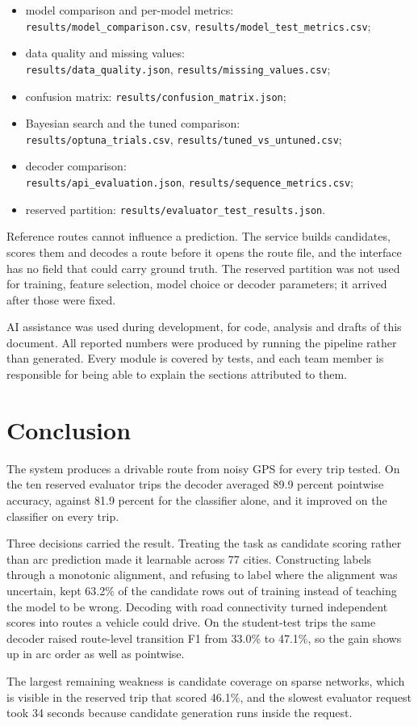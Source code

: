 \documentclass[11pt,a4paper]{article}
\begin{document}
\begin{itemize}[leftmargin=1.4em,itemsep=2pt,topsep=3pt]
\item model comparison and per-model metrics:\\
\texttt{results/model\_comparison.csv}, \texttt{results/model\_test\_metrics.csv};
\item data quality and missing values:\\
\texttt{results/data\_quality.json}, \texttt{results/missing\_values.csv};
\item confusion matrix: \texttt{results/confusion\_matrix.json};
\item Bayesian search and the tuned comparison:\\
\texttt{results/optuna\_trials.csv}, \texttt{results/tuned\_vs\_untuned.csv};
\item decoder comparison:\\
\texttt{results/api\_evaluation.json}, \texttt{results/sequence\_metrics.csv};
\item reserved partition: \texttt{results/evaluator\_test\_results.json}.
\end{itemize}

Reference routes cannot influence a prediction. The service builds candidates, scores them and decodes
a route before it opens the route file, and the interface has no field that could carry ground truth.
The reserved partition was not used for training, feature selection, model choice or decoder
parameters; it arrived after those were fixed.

AI assistance was used during development, for code, analysis and drafts of this document. All
reported numbers were produced by running the pipeline rather than generated. Every module is covered
by tests, and each team member is responsible for being able to explain the sections attributed to
them.

\section{Conclusion}

The system produces a drivable route from noisy GPS for every trip tested.
On the ten reserved evaluator trips the decoder averaged 89.9 percent pointwise accuracy, against 81.9 percent for the classifier alone, and it improved on the classifier on every trip.

Three decisions carried the result. Treating the task as candidate scoring rather than arc prediction
made it learnable across 77 cities. Constructing labels through a monotonic alignment, and refusing to
label where the alignment was uncertain, kept 63.2\% of the candidate rows out of training
instead of teaching the model to be wrong. Decoding with road connectivity turned independent scores into routes
a vehicle could drive. On the student-test trips the same decoder raised route-level transition F1 from 33.0\% to 47.1\%, so the gain shows up in arc order as well as pointwise.

The largest remaining weakness is candidate coverage on sparse networks, which is visible in the
reserved trip that scored 46.1\%, and the slowest evaluator request took
34 seconds because candidate generation runs inside the request.
\end{document}
